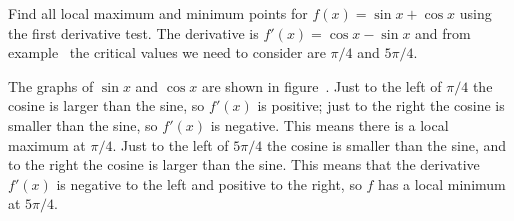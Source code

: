 \begin{example} Find all local maximum and minimum points for $f(x)=\sin x+\cos
x$ using the first derivative test.  The derivative is $f'(x)=\cos
x-\sin x$ and from example~ the critical
values we need to consider are $\pi/4$ and $5\pi/4$.

The graphs of $\sin x$ and $\cos x$ are shown in figure~. Just to the left of $\pi/4$ the cosine is larger than the
  sine, so $f'(x)$ is positive; just to the right the cosine is
  smaller than the sine, so $f'(x)$ is negative. This means there is a
  local maximum at $\pi/4$. Just to the left of $5\pi/4$ the cosine is
  smaller than the sine, and to the right the cosine is larger than
  the sine. This means that the derivative $f'(x)$ is negative to the
  left and positive to the right, so $f$ has a local minimum at
  $5\pi/4$.
\end{example}

